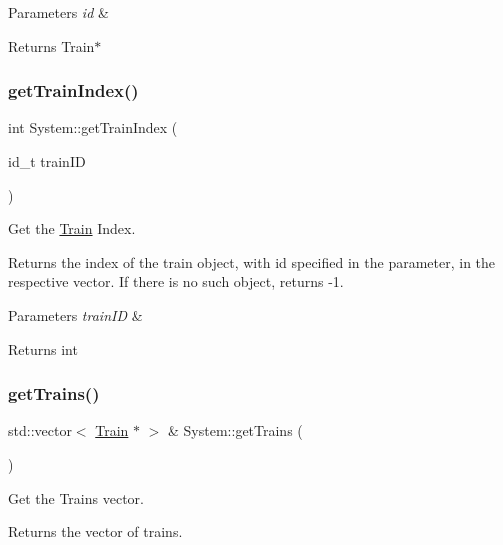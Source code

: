 \begin{DoxyParams}{Parameters}
{\em id} & \\
\hline
\end{DoxyParams}
\begin{DoxyReturn}{Returns}
Train$\ast$ 
\end{DoxyReturn}
\mbox{\label{classSystem_a15d033a2efda45b83bbe0800698ae712}} 
\subsubsection{\texorpdfstring{get\+Train\+Index()}{getTrainIndex()}}
{\footnotesize\ttfamily int System\+::get\+Train\+Index (\begin{DoxyParamCaption}\item[{id\+\_\+t}]{train\+ID }\end{DoxyParamCaption})}



Get the \mbox{\hyperlink{classTrain}{Train}} Index. 

Returns the index of the train object, with id specified in the parameter, in the respective vector. If there is no such object, returns -\/1.


\begin{DoxyParams}{Parameters}
{\em train\+ID} & \\
\hline
\end{DoxyParams}
\begin{DoxyReturn}{Returns}
int 
\end{DoxyReturn}
\mbox{\label{classSystem_a44ee205bcb6c27bb1a7bc7fb545aef44}} 
\subsubsection{\texorpdfstring{get\+Trains()}{getTrains()}}
{\footnotesize\ttfamily std\+::vector$<$ \mbox{\hyperlink{classTrain}{Train}} $\ast$ $>$ \& System\+::get\+Trains (\begin{DoxyParamCaption}{ }\end{DoxyParamCaption})}



Get the Trains vector. 

Returns the vector of trains.

